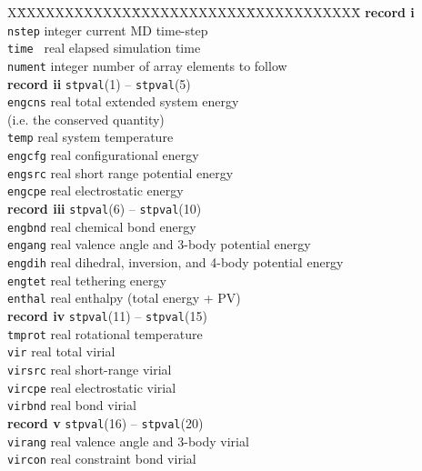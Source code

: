 \begin{tabbing}
X\=XXXXXXXXXXXX\=XXXXXXXXXXXX\=XXXXXXXXXXXX\=\kill
{\bf record i} \\
\> {\tt nstep}  \> integer \> current MD time-step \\
\> {\tt time }  \> real    \> elapsed simulation time \\
\> {\tt nument} \> integer \> number of array elements to follow \\
{\bf record ii} {\tt stpval}(1) -- {\tt stpval}(5) \\
\> {\tt engcns} \> real    \> total extended system energy \\
\>              \>         \> (i.e. the conserved quantity) \\
\> {\tt temp}   \> real    \> system temperature \\
\> {\tt engcfg} \> real    \> configurational energy \\
\> {\tt engsrc} \> real    \> short range potential energy \\
\> {\tt engcpe} \> real    \> electrostatic energy \\
{\bf record iii} {\tt stpval}(6) -- {\tt stpval}(10) \\
\> {\tt engbnd} \> real    \> chemical bond energy \\
\> {\tt engang} \> real    \> valence angle and 3-body potential energy \\
\> {\tt engdih} \> real    \> dihedral, inversion, and 4-body potential energy \\
\> {\tt engtet} \> real    \> tethering energy \\
\> {\tt enthal} \> real    \> enthalpy (total energy + PV) \\
{\bf record iv} {\tt stpval}(11) -- {\tt stpval}(15) \\
\> {\tt tmprot} \> real    \> rotational temperature \\
\> {\tt vir}    \> real    \> total virial \\
\> {\tt virsrc} \> real    \> short-range virial \\
\> {\tt vircpe} \> real    \> electrostatic virial \\
\> {\tt virbnd} \> real    \> bond virial \\
{\bf record v} {\tt stpval}(16) -- {\tt stpval}(20) \\
\> {\tt virang} \> real    \> valence angle and 3-body virial \\
\> {\tt vircon} \> real    \> constraint bond virial \\

\end{tabbing}
